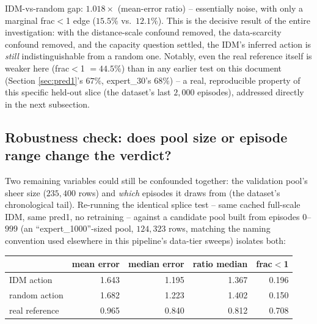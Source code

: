 \documentclass[11pt]{article}
\begin{document}
IDM-vs-random gap: $\mathbf{1.018\times}$ (mean-error ratio) -- essentially noise, with only a
marginal frac$<$1 edge ($15.5\%$ vs.\ $12.1\%$). This is the decisive result of the entire
investigation: with the distance-scale confound removed, the data-scarcity confound removed,
and the capacity question settled, the IDM's inferred action is \emph{still}
indistinguishable from a random one. Notably, even the real reference itself is weaker here
(frac$<$1 $=44.5\%$) than in any earlier test on this document (Section \ref{sec:pred1}'s
$67\%$, expert\_30's $68\%$) -- a real, reproducible property of this specific held-out slice
(the dataset's last $2{,}000$ episodes), addressed directly in the next subsection.

\subsection{Robustness check: does pool size or episode range change the verdict?}
\label{sec:robustness}

Two remaining variables could still be confounded together: the validation pool's sheer size
($235{,}400$ rows) and \emph{which} episodes it draws from (the dataset's chronological tail).
Re-running the identical splice test -- same cached full-scale IDM, same pred1, no retraining
-- against a candidate pool built from episodes $0$–$999$ (an ``expert\_1000''-sized pool,
$124{,}323$ rows, matching the naming convention used elsewhere in this pipeline's data-tier
sweeps) isolates both:

\begin{center}
\begin{tabular}{@{}lrrrr@{}}
\toprule
& mean error & median error & ratio median & frac$<$1 \\
\midrule
IDM action     & 1.643 & 1.195 & 1.367 & 0.196 \\
random action  & 1.682 & 1.223 & 1.402 & 0.150 \\
real reference & 0.965 & 0.840 & 0.812 & 0.708 \\
\bottomrule
\end{tabular}
\end{center}
\end{document}
